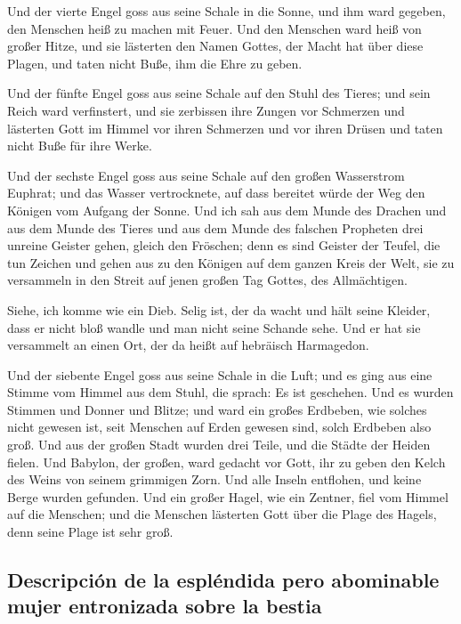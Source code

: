 Und der vierte Engel goss aus seine Schale in die Sonne,
und ihm ward gegeben, den Menschen heiß zu machen mit Feuer.
 Und den Menschen ward heiß von großer Hitze, und sie
lästerten den Namen Gottes, der Macht hat über diese Plagen, und taten
nicht Buße, ihm die Ehre zu geben.

 Und der fünfte Engel goss aus seine Schale auf den Stuhl
des Tieres; und sein Reich ward verfinstert, und sie zerbissen ihre
Zungen vor Schmerzen  und lästerten Gott im Himmel vor
ihren Schmerzen und vor ihren Drüsen und taten nicht Buße für ihre
Werke.

 Und der sechste Engel goss aus seine Schale auf den
großen Wasserstrom Euphrat; und das Wasser vertrocknete, auf dass
bereitet würde der Weg den Königen vom Aufgang der Sonne.
 Und ich sah aus dem Munde des Drachen und aus dem Munde
des Tieres und aus dem Munde des falschen Propheten drei unreine Geister
gehen, gleich den Fröschen;  denn es sind Geister der
Teufel, die tun Zeichen und gehen aus zu den Königen auf dem ganzen
Kreis der Welt, sie zu versammeln in den Streit auf jenen großen Tag
Gottes, des Allmächtigen.

 Siehe, ich komme wie ein Dieb. Selig ist, der da wacht
und hält seine Kleider, dass er nicht bloß wandle und man nicht seine
Schande sehe.  Und er hat sie versammelt an einen Ort,
der da heißt auf hebräisch Harmagedon.

 Und der siebente Engel goss aus seine Schale in die
Luft; und es ging aus eine Stimme vom Himmel aus dem Stuhl, die sprach:
Es ist geschehen.  Und es wurden Stimmen und Donner und
Blitze; und ward ein großes Erdbeben, wie solches nicht gewesen ist,
seit Menschen auf Erden gewesen sind, solch Erdbeben also groß.
 Und aus der großen Stadt wurden drei Teile, und die
Städte der Heiden fielen. Und Babylon, der großen, ward gedacht vor
Gott, ihr zu geben den Kelch des Weins von seinem grimmigen Zorn.
 Und alle Inseln entflohen, und keine Berge wurden
gefunden.  Und ein großer Hagel, wie ein Zentner, fiel
vom Himmel auf die Menschen; und die Menschen lästerten Gott über die
Plage des Hagels, denn seine Plage ist sehr groß.

\hypertarget{descripciuxf3n-de-la-espluxe9ndida-pero-abominable-mujer-entronizada-sobre-la-bestia}{%
\subsection{Descripción de la espléndida pero abominable mujer
entronizada sobre la
bestia}\label{descripciuxf3n-de-la-espluxe9ndida-pero-abominable-mujer-entronizada-sobre-la-bestia}}

